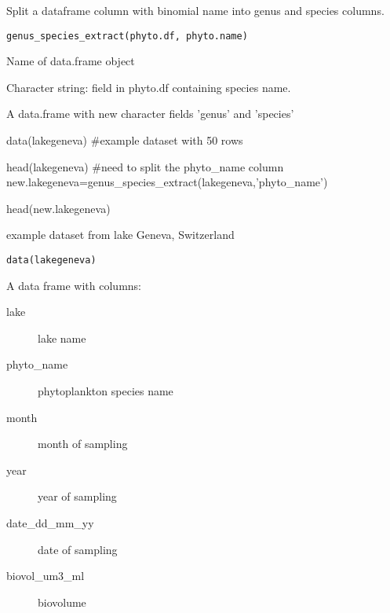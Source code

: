 \documentclass[a4paper]{book}
\begin{document}
%
\begin{Description}\relax
Split a dataframe column with binomial name into genus and species columns.
\end{Description}
%
\begin{Usage}
\begin{verbatim}
genus_species_extract(phyto.df, phyto.name)
\end{verbatim}
\end{Usage}
%
\begin{Arguments}
\begin{ldescription}
\item[\code{phyto.df}] Name of data.frame object

\item[\code{phyto.name}] Character string: field in phyto.df containing species name.
\end{ldescription}
\end{Arguments}
%
\begin{Value}
A data.frame with new character fields 'genus' and 'species'
\end{Value}
%
\begin{Examples}
\begin{ExampleCode}
data(lakegeneva)
#example dataset with 50 rows

head(lakegeneva) #need to split the phyto_name column
new.lakegeneva=genus_species_extract(lakegeneva,'phyto_name')

head(new.lakegeneva)
\end{ExampleCode}
\end{Examples}
%
\begin{Description}\relax
example dataset from lake Geneva, Switzerland
\end{Description}
%
\begin{Usage}
\begin{verbatim}
data(lakegeneva)
\end{verbatim}
\end{Usage}
%
\begin{Format}
A data frame with columns:
\begin{description}

\item[lake] lake name
\item[phyto\_name] phytoplankton species name
\item[month] month of sampling
\item[year] year of sampling
\item[date\_dd\_mm\_yy] date of sampling
\item[biovol\_um3\_ml] biovolume

\end{description}

\end{Format}
\end{document}
